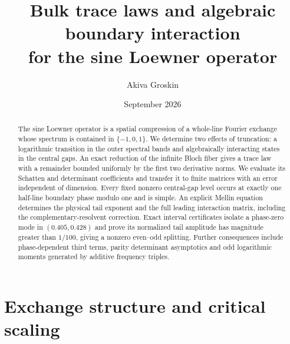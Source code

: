 \documentclass[11pt,a4paper]{article}
\title{Bulk trace laws and algebraic boundary interaction\\for the sine Loewner operator}
\author{Akiva Groskin}
\date{September 2026}
\theoremstyle{definition}
\numberwithin{equation}{section}
\begin{document}
\maketitle
\begin{abstract}
The sine Loewner operator is a spatial compression of a whole-line
Fourier exchange whose spectrum is contained in $\{-1,0,1\}$.
We determine two effects of truncation: a logarithmic transition in
the outer spectral bands and algebraically interacting states in the
central gaps. An exact reduction of the infinite Bloch fiber gives
a trace law with a remainder bounded uniformly by the first two
derivative norms. We evaluate its Schatten and determinant
coefficients and transfer it to finite matrices with an error independent
of dimension. Every fixed nonzero central-gap level occurs at exactly
one half-line boundary phase modulo one and is simple. An explicit
Mellin equation determines the physical tail exponent and the full
leading interaction matrix, including the complementary-resolvent
correction. Exact interval certificates isolate a phase-zero mode in
$(0.405,0.428)$ and prove its normalized tail amplitude has magnitude greater than $1/100$,
giving a nonzero even--odd splitting. Further consequences include
phase-dependent third terms, parity determinant asymptotics and odd
logarithmic moments generated by additive frequency triples.
\end{abstract}


\tableofcontents
\section{Exchange structure and critical scaling}\label{unified:sec:foundations}
\begingroup
\let\section\subsection
\let\subsection\subsubsection


\endgroup
\end{document}

